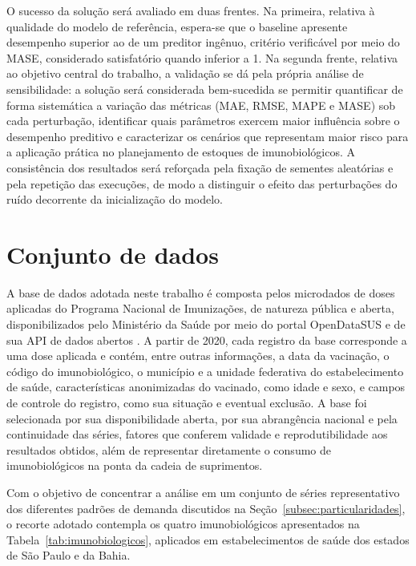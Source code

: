 \documentclass[
    12pt,                %
    openright,           %
    oneside,             %
    a4paper,             %
    english,             %
    brazil               %
]{abntex2}
\begin{document}
O sucesso da solução será avaliado em duas frentes. Na primeira, relativa à qualidade do modelo de referência, espera-se que o baseline apresente desempenho superior ao de um preditor ingênuo, critério verificável por meio do MASE, considerado satisfatório quando inferior a 1. Na segunda frente, relativa ao objetivo central do trabalho, a validação se dá pela própria análise de sensibilidade: a solução será considerada bem-sucedida se permitir quantificar de forma sistemática a variação das métricas (MAE, RMSE, MAPE e MASE) sob cada perturbação, identificar quais parâmetros exercem maior influência sobre o desempenho preditivo e caracterizar os cenários que representam maior risco para a aplicação prática no planejamento de estoques de imunobiológicos. A consistência dos resultados será reforçada pela fixação de sementes aleatórias e pela repetição das execuções, de modo a distinguir o efeito das perturbações do ruído decorrente da inicialização do modelo.

\section{Conjunto de dados}
\label{sec:conjunto_dados}

A base de dados adotada neste trabalho é composta pelos microdados de doses aplicadas do Programa Nacional de Imunizações, de natureza pública e aberta, disponibilizados pelo Ministério da Saúde por meio do portal OpenDataSUS e de sua API de dados abertos \cite{BrasilPNIDados}. A partir de 2020, cada registro da base corresponde a uma dose aplicada e contém, entre outras informações, a data da vacinação, o código do imunobiológico, o município e a unidade federativa do estabelecimento de saúde, características anonimizadas do vacinado, como idade e sexo, e campos de controle do registro, como sua situação e eventual exclusão. A base foi selecionada por sua disponibilidade aberta, por sua abrangência nacional e pela continuidade das séries, fatores que conferem validade e reprodutibilidade aos resultados obtidos, além de representar diretamente o consumo de imunobiológicos na ponta da cadeia de suprimentos.

Com o objetivo de concentrar a análise em um conjunto de séries representativo dos diferentes padrões de demanda discutidos na Seção~\ref{subsec:particularidades}, o recorte adotado contempla os quatro imunobiológicos apresentados na Tabela~\ref{tab:imunobiologicos}, aplicados em estabelecimentos de saúde dos estados de São Paulo e da Bahia.
\end{document}
